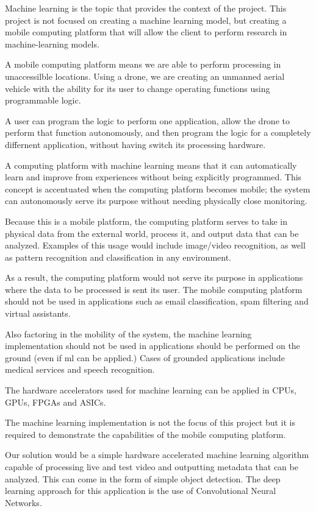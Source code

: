 
% 

Machine learning is the topic that provides the context of the project. This project is not focused on creating a machine learning model, but creating a mobile computing platform that will allow the client to perform research in machine-learning models.

A mobile computing platform means we are able to perform processing in unaccessilble locations. Using a drone, we are creating an unmanned aerial vehicle with the ability for its user to change operating functions using programmable logic.

A user can program the logic to perform one application, allow the drone to perform that function autonomously, and then program the logic for a completely differnent application, without having switch its processing hardware.

A computing platform with machine learning means that it can automatically learn and improve from experiences without being explicitly programmed. This concept is accentuated when the computing platform becomes mobile; the system can autonomously serve its purpose without needing physically close monitoring.

Because this is a mobile platform, the computing platform serves to take in physical data from the external world, process it, and output data that can be analyzed. Examples of this usage would include image/video recognition, as well as pattern recognition and classification in any environment.

As a result, the computing platform would not serve its purpose in applications where the data to be processed is sent its user. The mobile computing platform should not be used in applications such as email classification, spam filtering and virtual assistants.

Also factoring in the mobility of the system, the machine learning implementation should not be used in applications should be performed on the ground (even if ml can be applied.) Cases of grounded applications include medical services and speech recognition.

The hardware accelerators used for machine learning can be applied in CPUs, GPUs, FPGAs and ASICs. 

The machine learning implementation is not the focus of this project but it is required to demonstrate the capabilities of the mobile computing platform. 

Our solution would be a simple hardware accelerated machine learning algorithm capable of processing live and test video and outputting metadata that can be analyzed. This can come in the form of simple object detection. The deep learning approach for this application is the use of Convolutional Neural Networks.

